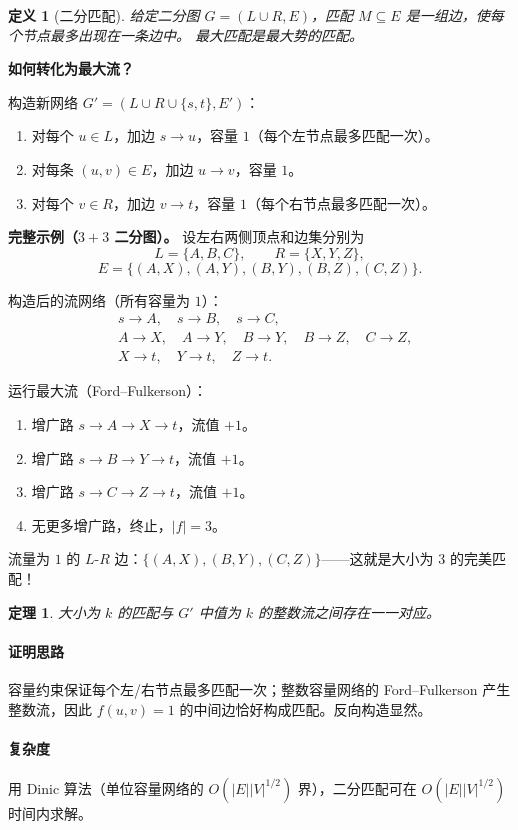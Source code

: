 \documentclass[UTF8,openany,12pt]{ctexbook}
\newtheorem{definition}{定义}[chapter]
\newtheorem{theorem}{定理}[chapter]
\theoremstyle{remark}
\newcommand{\complexity}[1]{\paragraph{复杂度}#1}
\newcommand{\proofidea}[1]{\paragraph{证明思路}#1}
\begin{document}
\begin{definition}[二分匹配]
给定二分图 $G=(L\cup R,E)$，匹配 $M\subseteq E$ 是一组边，使每个节点最多出现在一条边中。
\emph{最大匹配}是最大势的匹配。
\end{definition}

\noindent\textbf{如何转化为最大流？}

\noindent 构造新网络 $G'=(L\cup R\cup\{s,t\},E')$：
\begin{enumerate}
  \item 对每个 $u\in L$，加边 $s\to u$，容量 $1$（每个左节点最多匹配一次）。
  \item 对每条 $(u,v)\in E$，加边 $u\to v$，容量 $1$。
  \item 对每个 $v\in R$，加边 $v\to t$，容量 $1$（每个右节点最多匹配一次）。
\end{enumerate}

\noindent\textbf{完整示例（$3+3$ 二分图）。}
设左右两侧顶点和边集分别为
\[
  L=\{A,B,C\},\qquad R=\{X,Y,Z\},
\]
\[
  E=\{(A,X),(A,Y),(B,Y),(B,Z),(C,Z)\}.
\]

\medskip
\noindent 构造后的流网络（所有容量为 $1$）：
\begin{align*}
  &s\to A,\quad s\to B,\quad s\to C,\\
  &A\to X,\quad A\to Y,\quad B\to Y,\quad B\to Z,\quad C\to Z,\\
  &X\to t,\quad Y\to t,\quad Z\to t.
\end{align*}

\noindent 运行最大流（Ford--Fulkerson）：
\begin{enumerate}
  \item 增广路 $s\to A\to X\to t$，流值 $+1$。
  \item 增广路 $s\to B\to Y\to t$，流值 $+1$。
  \item 增广路 $s\to C\to Z\to t$，流值 $+1$。
  \item 无更多增广路，终止，$|f|=3$。
\end{enumerate}

\noindent 流量为 $1$ 的 $L$-$R$ 边：$\{(A,X),(B,Y),(C,Z)\}$——这就是大小为 $3$ 的完美匹配！

\begin{theorem}
大小为 $k$ 的匹配与 $G'$ 中值为 $k$ 的整数流之间存在一一对应。
\end{theorem}
\proofidea{容量约束保证每个左/右节点最多匹配一次；整数容量网络的 Ford--Fulkerson 产生整数流，因此 $f(u,v)=1$ 的中间边恰好构成匹配。反向构造显然。}

\complexity{用 Dinic 算法（单位容量网络的 $O(|E||V|^{1/2})$ 界），二分匹配可在 $O(|E||V|^{1/2})$ 时间内求解。}
\end{document}
